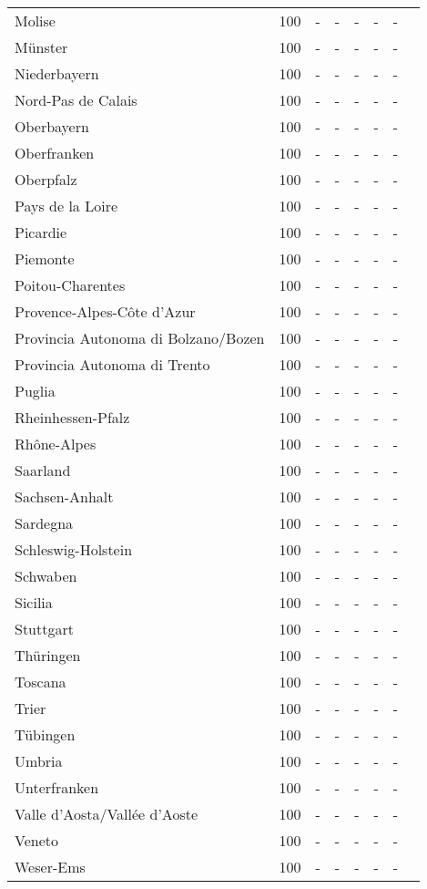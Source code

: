 \begin{table}[H]
\begin{tabularx}{\textwidth}{Xccccccc}
            Molise & 100 & - & - & - & - & - \\
            Münster & 100 & - & - & - & - & - \\
            Niederbayern & 100 & - & - & - & - & - \\
            Nord-Pas de Calais & 100 & - & - & - & - & - \\
            Oberbayern & 100 & - & - & - & - & - \\
            Oberfranken & 100 & - & - & - & - & - \\
            Oberpfalz & 100 & - & - & - & - & - \\
            Pays de la Loire & 100 & - & - & - & - & - \\
            Picardie & 100 & - & - & - & - & - \\
            Piemonte & 100 & - & - & - & - & - \\
            Poitou-Charentes & 100 & - & - & - & - & - \\
            Provence-Alpes-Côte d’Azur & 100 & - & - & - & - & - \\
            Provincia Autonoma di Bolzano/Bozen & 100 & - & - & - & - & - \\
            Provincia Autonoma di Trento & 100 & - & - & - & - & - \\
            Puglia & 100 & - & - & - & - & - \\
            Rheinhessen-Pfalz & 100 & - & - & - & - & - \\
            Rhône-Alpes & 100 & - & - & - & - & - \\
            Saarland & 100 & - & - & - & - & - \\
            Sachsen-Anhalt & 100 & - & - & - & - & - \\
            Sardegna & 100 & - & - & - & - & - \\
            Schleswig-Holstein & 100 & - & - & - & - & - \\
            Schwaben & 100 & - & - & - & - & - \\
            Sicilia & 100 & - & - & - & - & - \\
            Stuttgart & 100 & - & - & - & - & - \\
            Thüringen & 100 & - & - & - & - & - \\
            Toscana & 100 & - & - & - & - & - \\
            Trier & 100 & - & - & - & - & - \\
            Tübingen & 100 & - & - & - & - & - \\
            Umbria & 100 & - & - & - & - & - \\
            Unterfranken & 100 & - & - & - & - & - \\
            Valle d’Aosta/Vallée d’Aoste & 100 & - & - & - & - & - \\
            Veneto & 100 & - & - & - & - & - \\
            Weser-Ems & 100 & - & - & - & - & - \\
        \bottomrule
    \end{tabularx}
\end{table}
    